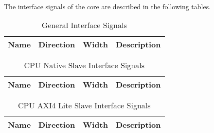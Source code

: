 \label{sec:is}

The interface signals of the core are described in the following tables.

\begin{table}[H]
  \centering
  \begin{tabular}{|l|l|r|p{10.5cm}|}
    
    \hline
    \rowcolor{iob-green}
    {\bf Name} & {\bf Direction} & {\bf Width} & {\bf Description}  \\ \hline \hline

    
 
  \end{tabular}
  \caption{General Interface Signals}
  \label{gen_is_tab:is}
\end{table}

\begin{table}[H]
  \centering
  \begin{tabular}{|l|l|r|p{10.5cm}|}
    
    \hline
    \rowcolor{iob-green}
    {\bf Name} & {\bf Direction} & {\bf Width} & {\bf Description}  \\ \hline \hline

    
 
  \end{tabular}
  \caption{CPU Native Slave Interface Signals}
  \label{cpu_nat_s_is_tab:is}
\end{table}

\begin{table}[H]
  \centering
  \begin{tabular}{|l|l|r|p{9.5cm}|}
    
    \hline
    \rowcolor{iob-green}
    {\bf Name} & {\bf Direction} & {\bf Width} & {\bf Description}  \\ \hline \hline

    
 
  \end{tabular}
  \caption{CPU AXI4 Lite Slave Interface Signals}
  \label{cpu_axi4lite_s_is_tab:is}
\end{table}

    

